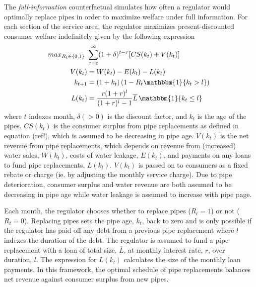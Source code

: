 \documentclass[12pt,table]{article}
\begin{document}
The \textit{full-information} counterfactual simulates how often a regulator would optimally replace pipes in order to maximize welfare under full information.  For each section of the service area, the regulator maximizes present-discounted consumer welfare indefinitely given by the following expression
\begin{align*}
max_{R_t\in\{0,1\}} \,\, &\sum_{\tau = t}^{\infty} (1+\delta)^{t-\tau} [CS(k_{t}) + V(k_{t})]  \\
V(k_{t}) &= W(k_{t}) - E(k_{t}) - L(k_{t})\\ 
k_{t+1} &=  (1 + k_t) \, (1-R_t \mathbbm{1} \{ k_{t}> l\}) \\
L(k_t) &= \frac{r(1+r)^{l} }{(1+r)^{l} -1 }\overline{L} \, \mathbbm{1} \{ k_{t}\leq l \}
\end{align*}
where $t$ indexes month, $\delta(>0)$ is the discount factor, and $k_t$ is the age of the pipes.  $CS(k_{t})$ is the consumer surplus from pipe replacements as defined in equation (ref!), which is assumed to be decreasing in pipe age.  $V(k_t)$ is the net revenue from pipe replacements, which depends on revenue from (increased) water sales, $W(k_{t})$, costs of water leakage, $E(k_{t})$, and payments on any loans to fund pipe replacements, $L(k_t)$.  $V(k_t)$ is passed on to consumers as a fixed rebate or charge (ie. by adjusting the monthly service charge).  Due to pipe deterioration, consumer surplus and water revenue are both assumed to be decreasing in pipe age while water leakage is assumed to increase with pipe page.  

Each month, the regulator chooses whether to replace pipes ($R_t = 1$) or not ($R_t = 0$).  Replacing pipes sets the pipe age, $k_t$, back to zero and is only possible if the regulator has paid off any debt from a previous pipe replacement where $l$ indexes the duration of the debt.  The regulator is assumed to fund a pipe replacement with a loan of total size, $\overline{L}$, at monthly interest rate, $r$, over duration, $l$.  The expression for $L(k_t)$ calculates the size of the monthly loan payments.  In this framework, the optimal schedule of pipe replacements balances net revenue against consumer surplus from new pipes.


\end{document}

